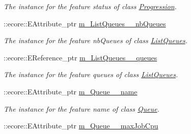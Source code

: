 \begin{DoxyCompactItemize}
\begin{DoxyCompactList}\small\item\em The instance for the feature status of class \hyperlink{classTMS__Data_1_1Progression}{Progression}. \item\end{DoxyCompactList}\item 
\hypertarget{classTMS__Data_1_1TMS__DataPackage_a8694b1d17dde0fc4266b0b8d570c91ce}{
::ecore::EAttribute\_\-ptr \hyperlink{classTMS__Data_1_1TMS__DataPackage_a8694b1d17dde0fc4266b0b8d570c91ce}{m\_\-ListQueues\_\-\_\-nbQueues}}
\label{classTMS__Data_1_1TMS__DataPackage_a8694b1d17dde0fc4266b0b8d570c91ce}

\begin{DoxyCompactList}\small\item\em The instance for the feature nbQueues of class \hyperlink{classTMS__Data_1_1ListQueues}{ListQueues}. \item\end{DoxyCompactList}\item 
\hypertarget{classTMS__Data_1_1TMS__DataPackage_a094f1184c8c506d4eda18d60d814c5a6}{
::ecore::EReference\_\-ptr \hyperlink{classTMS__Data_1_1TMS__DataPackage_a094f1184c8c506d4eda18d60d814c5a6}{m\_\-ListQueues\_\-\_\-queues}}
\label{classTMS__Data_1_1TMS__DataPackage_a094f1184c8c506d4eda18d60d814c5a6}

\begin{DoxyCompactList}\small\item\em The instance for the feature queues of class \hyperlink{classTMS__Data_1_1ListQueues}{ListQueues}. \item\end{DoxyCompactList}\item 
\hypertarget{classTMS__Data_1_1TMS__DataPackage_aa8ace59b5cc8ed37753ad1179f73a1f4}{
::ecore::EAttribute\_\-ptr \hyperlink{classTMS__Data_1_1TMS__DataPackage_aa8ace59b5cc8ed37753ad1179f73a1f4}{m\_\-Queue\_\-\_\-name}}
\label{classTMS__Data_1_1TMS__DataPackage_aa8ace59b5cc8ed37753ad1179f73a1f4}

\begin{DoxyCompactList}\small\item\em The instance for the feature name of class \hyperlink{classTMS__Data_1_1Queue}{Queue}. \item\end{DoxyCompactList}\item 
\hypertarget{classTMS__Data_1_1TMS__DataPackage_ad3ac1ea20d04b51ec9cbd8320634be62}{
::ecore::EAttribute\_\-ptr \hyperlink{classTMS__Data_1_1TMS__DataPackage_ad3ac1ea20d04b51ec9cbd8320634be62}{m\_\-Queue\_\-\_\-maxJobCpu}}
\label{classTMS__Data_1_1TMS__DataPackage_ad3ac1ea20d04b51ec9cbd8320634be62}


\end{DoxyCompactItemize}
